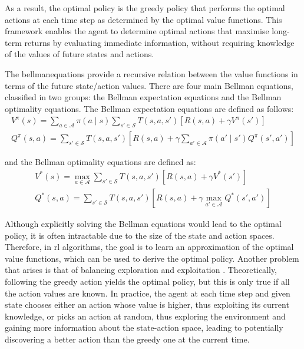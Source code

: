 As a result, the optimal policy is the greedy policy that performs the optimal actions at each time step as determined by the optimal value functions. This framework enables the agent to determine optimal actions that maximise long-term returns by evaluating immediate information, without requiring knowledge of the values of future states and actions.

The \Gls{bellmanequations} \cite{Bellman1957book} provide a recursive relation between the value functions in terms of the future state/action values. There are four main Bellman equations, classified in two groups: the Bellman expectation equations and the Bellman optimality equations. The Bellman expectation equations are defined as follows:
\begin{eqnarray}
    V^\pi(s) = \sum_{a \in \mathcal{A}} \pi\left(a \mid s\right) \sum_{s'\in \mathcal{S}} T\left(s, a, s'\right) \left[R\left(s,a\right) + \gamma V^\pi(s')\right] \\ 
    Q^\pi(s, a) = \sum_{s'\in \mathcal{S}} T\left(s, a, s'\right) \left[R\left(s,a\right) + \gamma \sum_{a' \in \mathcal{A}} \pi\left(a' \mid s'\right) Q^\pi(s', a')\right]
\end{eqnarray}

and the Bellman optimality equations are defined as:
\begin{eqnarray}
    V^*(s) = \max_{a \in \mathcal{A}} \sum_{s'\in \mathcal{S}} T\left(s, a, s'\right) \left[R\left(s,a\right) + \gamma V^*(s')\right] \\
    Q^*(s, a) = \sum_{s'\in \mathcal{S}} T\left(s, a, s'\right) \left[R\left(s,a\right) + \gamma \max_{a' \in \mathcal{A}} Q^*(s', a')\right]
\end{eqnarray}

Although explicitly solving the Bellman equations would lead to the optimal policy, it is often intractable due to the size of the state and action spaces. Therefore, in \acrshort{rl} algorithms, the goal is to learn an approximation of the optimal value functions, which can be used to derive the optimal policy. Another problem that arises is that of balancing exploration and exploitation \cite{Thrun1992}. Theoretically, following the greedy action yields the optimal policy, but this is only true if all the action values are known. In practice, the agent at each time step and given state chooses either an action whose value is higher, thus exploiting its current knowledge, or picks an action at random, thus exploring the environment and gaining more information about the state-action space, leading to potentially discovering a better action than the greedy one at the current time.


